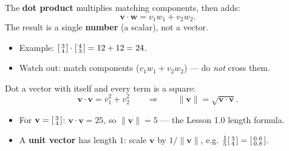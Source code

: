 \documentclass[aspectratio=169, 11pt]{beamer}
\newcommand{\vv}{\mathbf{v}}
\newcommand{\ww}{\mathbf{w}}
\begin{document}
\begin{frame}[t, plain]
  The \textbf{dot product} multiplies matching components, then adds:
  \[
    \vv\cdot\ww = v_1 w_1 + v_2 w_2 .
  \]
  The result is a single \textbf{number} (a scalar), not a vector.
  \begin{itemize}
    \item Example: $\begin{bsmallmatrix} 3\\4 \end{bsmallmatrix}\cdot\begin{bsmallmatrix} 4\\3 \end{bsmallmatrix}=12+12=24$.
    \item Watch out: match components ($v_1w_1+v_2w_2$) --- do \emph{not} cross them.
  \end{itemize}
\end{frame}

\begin{frame}[t, plain]
  Dot a vector with itself and every term is a square:
  \[
    \vv\cdot\vv = v_1^2 + v_2^2
    \qquad\Longrightarrow\qquad
    \|\vv\| = \sqrt{\vv\cdot\vv}.
  \]
  \begin{itemize}
    \item For $\vv=\begin{bsmallmatrix} 3\\4 \end{bsmallmatrix}$: $\vv\cdot\vv=25$, so $\|\vv\|=5$ --- the Lesson 1.0 length formula.
    \item A \textbf{unit vector} has length $1$: scale $\vv$ by $1/\|\vv\|$, e.g. $\tfrac15\begin{bsmallmatrix} 3\\4 \end{bsmallmatrix}=\begin{bsmallmatrix} 0.6\\0.8 \end{bsmallmatrix}$.
  \end{itemize}
\end{frame}
\end{document}
